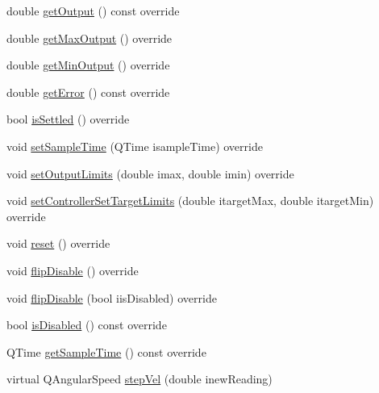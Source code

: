\begin{DoxyCompactItemize}
\item 
double \mbox{\hyperlink{classokapi_1_1IterativeVelPIDController_ab3f4050524cb54b4e3df951a8d84ac57}{get\+Output}} () const override
\item 
double \mbox{\hyperlink{classokapi_1_1IterativeVelPIDController_acf26277c959a7fd03c918340e194a361}{get\+Max\+Output}} () override
\item 
double \mbox{\hyperlink{classokapi_1_1IterativeVelPIDController_a0401715743d991c5ca9f3afa51a5a069}{get\+Min\+Output}} () override
\item 
double \mbox{\hyperlink{classokapi_1_1IterativeVelPIDController_a7e60b432a91d73db0a62c5d31759ed10}{get\+Error}} () const override
\item 
bool \mbox{\hyperlink{classokapi_1_1IterativeVelPIDController_a818347e199d8e7fd3e11f9f1aa369749}{is\+Settled}} () override
\item 
void \mbox{\hyperlink{classokapi_1_1IterativeVelPIDController_aef5ba457e81871d47519413551856bb8}{set\+Sample\+Time}} (Q\+Time isample\+Time) override
\item 
void \mbox{\hyperlink{classokapi_1_1IterativeVelPIDController_a02efd865f97b0f2da3f826c1120ec07b}{set\+Output\+Limits}} (double imax, double imin) override
\item 
void \mbox{\hyperlink{classokapi_1_1IterativeVelPIDController_a054d5bff10ba504b9f72db567ad45bfb}{set\+Controller\+Set\+Target\+Limits}} (double itarget\+Max, double itarget\+Min) override
\item 
void \mbox{\hyperlink{classokapi_1_1IterativeVelPIDController_a51607c29e072a672522a9e93bbd12410}{reset}} () override
\item 
void \mbox{\hyperlink{classokapi_1_1IterativeVelPIDController_a9a575df2d0a53ca71a812a86d673b8fa}{flip\+Disable}} () override
\item 
void \mbox{\hyperlink{classokapi_1_1IterativeVelPIDController_a6bd2a04813b0fd99f0904808ff963f28}{flip\+Disable}} (bool iis\+Disabled) override
\item 
bool \mbox{\hyperlink{classokapi_1_1IterativeVelPIDController_a628a5093634f85d788015c4cc1353c54}{is\+Disabled}} () const override
\item 
Q\+Time \mbox{\hyperlink{classokapi_1_1IterativeVelPIDController_aa786680075677c2f43619d48cad0e154}{get\+Sample\+Time}} () const override
\item 
virtual Q\+Angular\+Speed \mbox{\hyperlink{classokapi_1_1IterativeVelPIDController_a61f240eba6823d4174f2d7cc4b524239}{step\+Vel}} (double inew\+Reading)

\end{DoxyCompactItemize}
